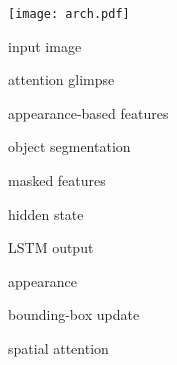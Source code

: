 
\vspace{.5\baselineskip}

\begin{minipage}[c]{0.3\textwidth}
    \centering
    \begin{minipage}[c]{\textwidth}
    \texttt{[image: arch.pdf]}
    \end{minipage}
    \vspace{-1\baselineskip}
    
    \begin{minipage}[c]{0.5\textwidth}
        \begin{description}[labelsep=1em, leftmargin=!,labelwidth=\widthof{\bfseries $\bmapt$}]
            \item[$\bxt$] input image
            \item[$\bgt$] attention glimpse
            \item[$\bmapt$] appearance-based features
            \item[$\bst$] object segmentation
            \item[$\bvt$] masked features
        \end{description}
    \end{minipage}\hfill
    \begin{minipage}[c]{0.5\textwidth}
       \begin{description}[labelsep=1em, leftmargin=!,labelwidth=\widthof{\bfseries $\Delta \widehat{\bb}_t$}]
            \item[$\B{h}_t$] hidden state
            \item[$\bot$] LSTM output
            \item[$\bapp_{t+1}$] appearance
            \item[$\Delta \widehat{\bb}_t$] bounding-box update
            \item[$\ba_{t+1}$] spatial attention
        \end{description}
    \end{minipage}
\end{minipage}
